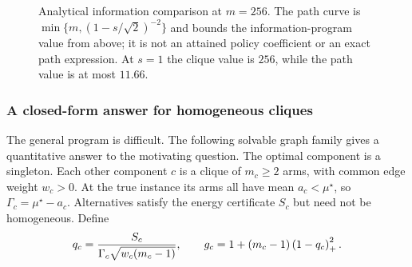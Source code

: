 \begin{figure}[t]
\centering
{}
\caption{Analytical information comparison at $m=256$. The path curve is $\min\{m,(1-s/\sqrt2)^{-2}\}$ and bounds the information-program value from above; it is not an attained policy coefficient or an exact path expression. At $s=1$ the clique value is $256$, while the path value is at most $11.66$.}
\label{alignment_paper:fig:geometryinformation}
\end{figure}



\subsubsection{A closed-form answer for homogeneous cliques}
The general program is difficult. The following solvable graph family gives a quantitative answer to the motivating question. The optimal component is a singleton. Each other component $c$ is a clique of $m_c\ge2$ arms, with common edge weight $w_c>0$. At the true instance its arms all have mean $a_c<\mu^\star$, so $\Gamma_c=\mu^\star-a_c$. Alternatives satisfy the energy certificate $S_c$ but need not be homogeneous. Define
\begin{equation}
 q_c=\frac{S_c}{\Gamma_c\sqrt{w_c(m_c-1)}},\qquad
 g_c=1+(m_c-1)\left(1-q_c\right)_+^2.
 \label{alignment_paper:eq:alignmentratio}
\end{equation}


